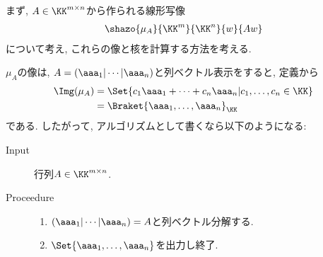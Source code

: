 まず,
$A\in \KK^{m\times n}$から作られる線形写像
\begin{align*}
  \shazo{\mu_A}{\KK^m}{\KK^n}{w}{Aw}
\end{align*}
について考え,
これらの像と核を計算する方法を考える.

$\mu_A$の像は, $A=(\aaa_1|\cdots|\aaa_n)$と列ベクトル表示をすると,
定義から
\begin{align*}
  \Img(\mu_A)&=\Set{c_1\aaa_1+\cdots+c_n\aaa_n|c_1,\ldots,c_n\in \KK}\\
  &=\Braket{\aaa_1,\ldots,\aaa_n}_{\KK}
\end{align*}
である. したがって, アルゴリズムとして書くなら以下のようになる:
\begin{algorithm}\makebox{}
\begin{description}
\item[Input]
  行列$A\in\KK^{m\times n}$.
\item[Proceedure]\makebox{}
  \begin{enumerate}
  \item $(\aaa_1|\cdots|\aaa_n)=A$と列ベクトル分解する.
  \item $\Set{\aaa_1,\ldots,\aaa_n}$を出力し終了.
  \end{enumerate}
\end{description}
\end{algorithm}

